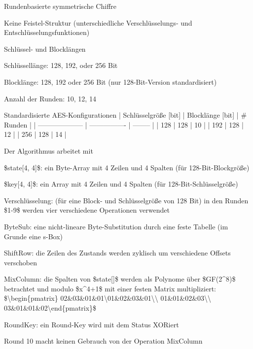 \documentclass[a4paper]{article}
\begin{document}
\begin{multicols}{3}
\begin{itemize*}
\begin{itemize*}
            \end{itemize*}
            \item Rundenbasierte symmetrische Chiffre
            \item Keine Feistel-Struktur (unterschiedliche Verschlüsselungs- und
            Entschlüsselungsfunktionen)
            \item Schlüssel- und Blocklängen
            \begin{itemize*}
                  \item Schlüssellänge: 128, 192, oder 256 Bit
                  \item Blocklänge: 128, 192 oder 256 Bit (nur 128-Bit-Version standardisiert)
                  \item Anzahl der Runden: 10, 12, 14
            \end{itemize*}
      \end{itemize*}

      Standardisierte AES-Konfigurationen | Schlüsselgröße {[}bit{]}
      | Blocklänge {[}bit{]} | \# Runden |
      | --------------------
      | ---------------- |
      -------- | | 128 | 128
      | 10 | | 192 | 128 | 12
      | | 256 | 128 | 14 |

      \begin{itemize*}
            \item Der Algorithmus arbeitet mit
            \begin{itemize*}
                  \item \$state{[}4, 4{]}\$: ein Byte-Array mit 4 Zeilen und 4 Spalten (für 128-Bit-Blockgröße)
                  \item \$key{[}4, 4{]}\$: ein Array mit 4 Zeilen und 4 Spalten (für 128-Bit-Schlüsselgröße)
            \end{itemize*}
            \item Verschlüsselung: (für eine Block- und Schlüsselgröße von 128 Bit) in
            den Runden \$1-9\$ werden vier verschiedene Operationen verwendet
            \begin{itemize*}
                  \item ByteSub: eine nicht-lineare Byte-Substitution durch eine feste Tabelle (im Grunde eine s-Box)
                  \item ShiftRow: die Zeilen des Zustands werden zyklisch um verschiedene Offsets verschoben
                  \item MixColumn: die Spalten von \$state{[}{]}\$ werden als Polynome über \$GF(2\^{}8)\$ betrachtet und modulo \$x\^{}4+1\$ mit einer festen Matrix multipliziert: \$\textbackslash begin\{pmatrix\} 02\&03\&01\&01\textbackslash01\&02\&03\&01\textbackslash\textbackslash{} 01\&01\&02\&03\textbackslash\textbackslash{} 03\&01\&01\&02\textbackslash end\{pmatrix\}\$
                  \item RoundKey: ein Round-Key wird mit dem Status XORiert
            \end{itemize*}
            \item Round 10 macht keinen Gebrauch von der Operation MixColumn
      \end{itemize*}


\end{multicols}
\end{document}

